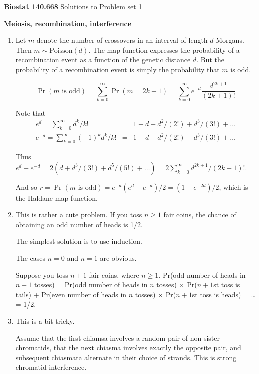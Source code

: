 \documentclass[12pt]{article}
\begin{document}
\thispagestyle{empty}

\noindent \textbf{Biostat 140.668} \hfill Solutions to Problem set 1

\bigskip 

\noindent \textbf{Meiosis, recombination, interference}

\begin{enumerate}

\item Let $m$ denote the number of crossovers in an interval of length $d$
Morgans.  Then $m \sim \text{Poisson}(d)$.  The map function expresses
the probability of a recombination event as a function of the genetic
distance $d$.  But the probability of a recombination event is simply
the probability that $m$ is odd.

$$\Pr(m \text{ is odd})  =  \sum_{k=0}^{\infty} \Pr(m = 2k+1) 
 =  \sum_{k=0}^{\infty} e^{-d} \frac{d^{2k+1}}{(2k+1)!}$$

Note that 
\begin{eqnarray*}
e^d = \sum_{k=0}^{\infty} d^k/k! & = & 1 + d + d^2/(2!) +
d^3/(3!) + \dots \\
e^{-d} = \sum_{k=0}^{\infty} (-1)^k d^k/k! & = & 1
- d + d^2/(2!) - d^3/(3!) + \dots
\end{eqnarray*}

Thus $e^d - e^{-d} = 2(d + d^3/(3!) + d^5/(5!) + \dots) = 2
\sum_{k=0}^{\infty} d^{2k+1}/(2k+1)!$.

And so $r = \Pr(m \text{ is odd}) = e^{-d} (e^{d} - e^{-d})/2 =
(1-e^{-2d})/2$, which is the Haldane map function.
\bigskip

\item This is rather a cute problem.  If you toss $n \ge 1$ fair coins, the
chance of obtaining an odd number of heads is 1/2.  

The simplest solution is to use induction.  

The cases $n=0$ and $n=1$ are obvious.  

Suppose you toss $n+1$ fair coins, where $n \ge 1$.  Pr(odd number of
heads in $n+1$ tosses) = Pr(odd number of heads in $n$ tosses)
$\times$ Pr($n+1$st toss is tails) + Pr(even number of heads in $n$
tosses) $\times$ Pr($n+1$st toss is heads) = \ldots = 1/2.


\item This is a bit tricky.  

Assume that the first chiamsa involves a random pair of non-sister
chromatids, that the next chiasma involves exactly the opposite pair,
and subsequent chiasmata alternate in their choice of strands.  This
is strong chromatid interference.


\end{enumerate}
\end{document}
